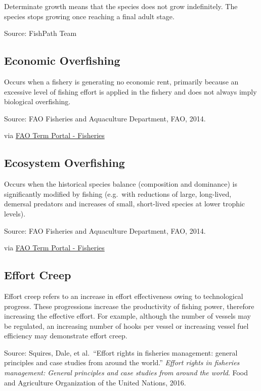 \documentclass[
  11pt,
]{book}
\begin{document}
Determinate growth means that the species does not grow indefinitely. The species stops growing once reaching a final adult stage.

Source: FishPath Team

\hypertarget{economic-overfishing}{%
\subsection{Economic Overfishing}\label{economic-overfishing}}

Occurs when a fishery is generating no economic rent, primarily because an excessive level of fishing effort is applied in the fishery and does not always imply biological overfishing.

Source: FAO Fisheries and Aquaculture Department, FAO, 2014.

via \href{http://www.fao.org/fishery/glossary/en}{FAO Term Portal - Fisheries}

\hypertarget{ecosystem-overfishing}{%
\subsection{Ecosystem Overfishing}\label{ecosystem-overfishing}}

Occurs when the historical species balance (composition and dominance) is significantly modified by fishing (e.g.~with reductions of large, long-lived, demersal predators and increases of small, short-lived species at lower trophic levels).

Source: FAO Fisheries and Aquaculture Department, FAO, 2014.

via \href{http://www.fao.org/fishery/glossary/en}{FAO Term Portal - Fisheries}

\hypertarget{effort-creep}{%
\subsection{Effort Creep}\label{effort-creep}}

Effort creep refers to an increase in effort effectiveness owing to technological progress. These progressions increase the productivity of fishing power, therefore increasing the effective effort. For example, although the number of vessels may be regulated, an increasing number of hooks per vessel or increasing vessel fuel efficiency may demonstrate effort creep.

Source: Squires, Dale, et al.~``Effort rights in fisheries management: general principles and case studies from around the world.'' \emph{Effort rights in fisheries management: General principles and case studies from around the world}. Food and Agriculture Organization of the United Nations, 2016.
\end{document}
